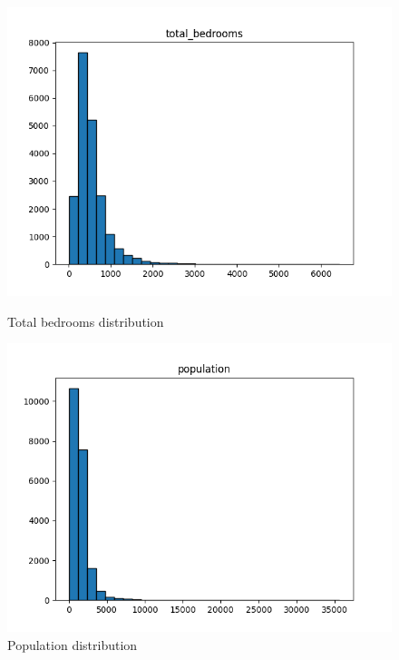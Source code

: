 \documentclass[a4paper, 11pt]{article}
\begin{document}
\begin{figure}[htbp]
    \vspace{0.1cm}  %
    
    \begin{minipage}{0.45\textwidth}
        \centering
        \includegraphics[width=\linewidth]{figs/total_bedrooms_distribution.png}
        \caption{Total bedrooms distribution}
        \label{fig:total_bedrooms_distribution}
    \end{minipage}\hfill
    \begin{minipage}{0.45\textwidth}
        \centering
        \includegraphics[width=\linewidth]{figs/population_distribution.png}
        \caption{Population distribution}
        \label{fig:population_distribution}
    \end{minipage}
\end{figure}
\end{document}
